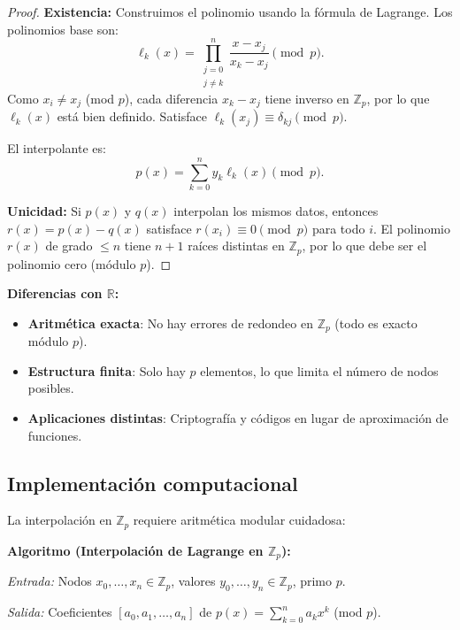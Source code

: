 \documentclass[a4paper,11pt]{report}
\begin{document}
\begin{proof}
\textbf{Existencia:} Construimos el polinomio usando la fórmula de Lagrange. Los polinomios base son:
\[
\ell_k(x) = \prod_{\substack{j=0 \\ j \neq k}}^n \frac{x - x_j}{x_k - x_j} \pmod{p}.
\]
Como $x_i \neq x_j$ (mod $p$), cada diferencia $x_k - x_j$ tiene inverso en $\mathbb{Z}_p$, por lo que $\ell_k(x)$ está bien definido. Satisface $\ell_k(x_j) \equiv \delta_{kj} \pmod{p}$.

El interpolante es:
\[
p(x) = \sum_{k=0}^n y_k \ell_k(x) \pmod{p}.
\]

\textbf{Unicidad:} Si $p(x)$ y $q(x)$ interpolan los mismos datos, entonces $r(x) = p(x) - q(x)$ satisface $r(x_i) \equiv 0 \pmod{p}$ para todo $i$. El polinomio $r(x)$ de grado $\leq n$ tiene $n+1$ raíces distintas en $\mathbb{Z}_p$, por lo que debe ser el polinomio cero (módulo $p$).
\end{proof}

\textbf{Diferencias con $\mathbb{R}$:}
\begin{itemize}
\item \textbf{Aritmética exacta}: No hay errores de redondeo en $\mathbb{Z}_p$ (todo es exacto módulo $p$).
\item \textbf{Estructura finita}: Solo hay $p$ elementos, lo que limita el número de nodos posibles.
\item \textbf{Aplicaciones distintas}: Criptografía y códigos en lugar de aproximación de funciones.
\end{itemize}

\subsection{Implementación computacional}

La interpolación en $\mathbb{Z}_p$ requiere aritmética modular cuidadosa:

\textbf{Algoritmo (Interpolación de Lagrange en $\mathbb{Z}_p$):}

\textit{Entrada:} Nodos $x_0, \ldots, x_n \in \mathbb{Z}_p$, valores $y_0, \ldots, y_n \in \mathbb{Z}_p$, primo $p$.

\textit{Salida:} Coeficientes $[a_0, a_1, \ldots, a_n]$ de $p(x) = \sum_{k=0}^n a_k x^k$ (mod $p$).
\end{document}
